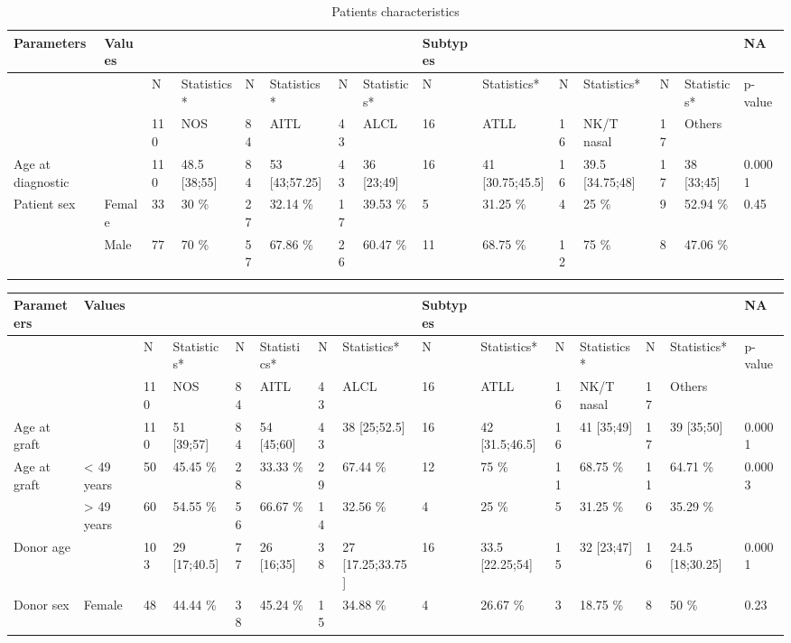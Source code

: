 \documentclass[a4paper,11pt] {article}
\begin{document}
\begin{landscape}
\begin{longtable}{lllllllllllllll}
  \hline
Parameters & Values &  &  &  &  &  &  & Subtypes &  &  &  &  &  & NA \\ 
  \hline
 &  & N & Statistics* & N & Statistics* & N & Statistics* & N & Statistics* & N & Statistics* & N & Statistics* & p-value \\ 
   &  & 110 & NOS & 84 & AITL & 43 & ALCL & 16 & ATLL & 16 & NK/T nasal & 17 & Others &  \\ 
  Age at diagnostic &  & 110 & 48.5 [38;55] & 84 & 53 [43;57.25] & 43 & 36 [23;49] & 16 & 41 [30.75;45.5] & 16 & 39.5 [34.75;48] & 17 & 38 [33;45] & 0.0001 \\ 
  Patient sex & Female & 33 & 30 \% & 27 & 32.14 \% & 17 & 39.53 \% & 5 & 31.25 \% & 4 & 25 \% & 9 & 52.94 \% & 0.45 \\ 
   & Male & 77 & 70 \% & 57 & 67.86 \% & 26 & 60.47 \% & 11 & 68.75 \% & 12 & 75 \% & 8 & 47.06 \% &  \\ 
   \hline
\hline
\caption{Patients characteristics} 
\label{tab:pat}
\end{longtable}
\begin{longtable}{lllllllllllllll}
  \hline
Parameters & Values &  &  &  &  &  &  & Subtypes &  &  &  &  &  & NA \\ 
  \hline
 &  & N & Statistics* & N & Statistics* & N & Statistics* & N & Statistics* & N & Statistics* & N & Statistics* & p-value \\ 
   &  & 110 & NOS & 84 & AITL & 43 & ALCL & 16 & ATLL & 16 & NK/T nasal & 17 & Others &  \\ 
  Age at graft &  & 110 & 51 [39;57] & 84 & 54 [45;60] & 43 & 38 [25;52.5] & 16 & 42 [31.5;46.5] & 16 & 41 [35;49] & 17 & 39 [35;50] & 0.0001 \\ 
  Age at graft & < 49 years & 50 & 45.45 \% & 28 & 33.33 \% & 29 & 67.44 \% & 12 & 75 \% & 11 & 68.75 \% & 11 & 64.71 \% & 0.0003 \\ 
   & > 49 years & 60 & 54.55 \% & 56 & 66.67 \% & 14 & 32.56 \% & 4 & 25 \% & 5 & 31.25 \% & 6 & 35.29 \% &  \\ 
  Donor age &  & 103 & 29 [17;40.5] & 77 & 26 [16;35] & 38 & 27 [17.25;33.75] & 16 & 33.5 [22.25;54] & 15 & 32 [23;47] & 16 & 24.5 [18;30.25] & 0.0001 \\ 
  Donor sex & Female & 48 & 44.44 \% & 38 & 45.24 \% & 15 & 34.88 \% & 4 & 26.67 \% & 3 & 18.75 \% & 8 & 50 \% & 0.23 \\ 

\end{longtable}
\end{landscape}
\end{document}
